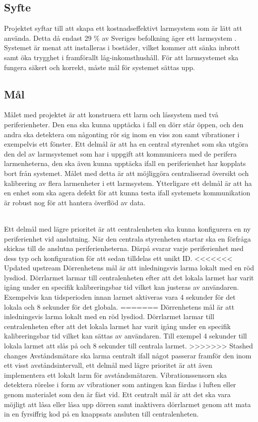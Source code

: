 \documentclass{article}
\begin{document}

\subsection{Syfte}
Projektet syftar till att skapa ett kostnadseffektivt larmsystem som är lätt att använda.
Detta då endast 29 \% av Sveriges befolkning äger ett larmsystem \cite{SSF}.
Systemet är menat att installeras i bostäder, vilket kommer att sänka inbrott samt öka trygghet i framförallt låg-inkomsthushåll.
För att larmsystemet ska fungera säkert och korrekt, måste mål för systemet sättas upp.

\subsection{Mål}
Målet med projektet är att konstruera ett larm och låssystem med två periferienheter.
Den ena ska kunna upptäcka i fall en dörr står öppen, och den andra ska detektera om någonting rör sig inom en viss zon samt vibrationer i exempelvis ett fönster. 
Ett delmål är att ha en central styrenhet som ska utgöra den del av larmsystemet som har i uppgift att kommunicera med de perifera larmenheterna, den ska även kunna upptäcka ifall en periferienhet har kopplats bort från systemet.
Målet med detta är att möjliggöra centraliserad översikt och kalibrering av flera larmenheter i ett larmsystem.
Ytterligare ett delmål är att ha en enhet som ska agera defekt för att kunna testa ifall systemets kommunikation är robust nog för att hantera överflöd av data.

\noindent
\\
Ett delmål med lägre prioritet är att centralenheten ska kunna konfigurera en ny periferienhet vid anslutning. När den centrala styrenheten startar ska en förfråga skickas till de anslutna periferienheterna.
Därpå svarar varje periferienhet med dess typ och konfiguration för att sedan tilldelas ett unikt ID. 
<<<<<<< Updated upstream
Dörrenhetens mål är att inledningsvis larma lokalt med en röd lysdiod. 
Dörrlarmet larmar till centralenheten efter att det lokala larmet har varit igång under en specifik kalibreringsbar tid vilket kan justeras av användaren. Exempelvis kan tidsperioden innan larmet aktiveras vara 4 sekunder för det lokala och 8 sekunder för det globala.
=======
Dörrenhetens mål är att inledningsvis larma lokalt med en röd lysdiod. 	
Dörrlarmet larmar till centralenheten efter att det lokala larmet har varit igång under en specifik kalibreringsbar tid vilket kan sättas av användaren. Till exempel 4 sekunder till lokala larmet att slås på och 8 sekunder till centrala larmet.
>>>>>>> Stashed changes
Avståndsmätare ska larma centralt ifall något passerar framför den inom ett visst avståndsintervall, ett delmål med lägre prioritet är att även implementera ett lokalt larm för avståndsmätaren.
Vibrationssensorn ska detektera rörelse i form av vibrationer som antingen kan färdas i luften eller genom materialet som den är fäst vid.
Ett centralt mål är att det ska vara möjligt att låsa eller låsa upp dörren samt inaktivera dörrlarmet genom att mata in en fyrsiffrig kod på en knappsats ansluten till centralenheten.
\end{document}

